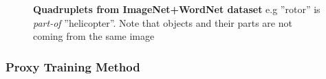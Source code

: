 \begin{figure}[t!]
  \begin{center}

    \caption{{\bf Quadruplets from ImageNet+WordNet dataset} e.g ''rotor'' is
    \textit{part-of} ''helicopter''. Note that objects and their parts are not
    coming from the same image}

    \label{fig:quad}
    \end{center}
\end{figure}




\subsubsection{Proxy Training Method}



